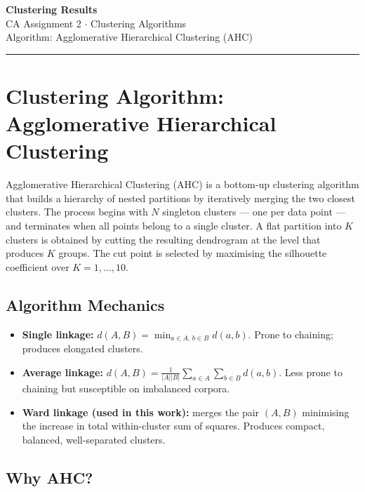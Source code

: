 \documentclass[11pt, a4paper]{article}
\begin{document}
\begin{center}
  {\LARGE\bfseries\color{darkblue} Clustering Results}\\[4pt]
  {\normalsize CA Assignment 2 $\cdot$ Clustering Algorithms}\\[2pt]
  {\normalsize Algorithm: Agglomerative Hierarchical Clustering (AHC)}
\end{center}

\vspace{4pt}
\textcolor{framebd}{\rule{\linewidth}{0.8pt}}
\vspace{6pt}

\section{Clustering Algorithm: Agglomerative Hierarchical Clustering}

Agglomerative Hierarchical Clustering (AHC) is a bottom-up clustering
algorithm that builds a hierarchy of nested partitions by iteratively merging
the two closest clusters.  The process begins with $N$ singleton clusters ---
one per data point --- and terminates when all points belong to a single
cluster.  A flat partition into $K$ clusters is obtained by cutting the
resulting dendrogram at the level that produces $K$ groups.  The cut point
is selected by maximising the silhouette coefficient over $K = 1, \ldots, 10$.

\subsection{Algorithm Mechanics}

\begin{itemize}
  \item \textbf{Single linkage:}
        $d(A,B) = \min_{a \in A,\, b \in B} d(a,b)$.
        Prone to chaining; produces elongated clusters.

  \item \textbf{Average linkage:}
        $d(A,B) = \frac{1}{|A||B|}\sum_{a \in A}\sum_{b \in B} d(a,b)$.
        Less prone to chaining but susceptible on imbalanced corpora.

  \item \textbf{Ward linkage (used in this work):}  merges the pair $(A, B)$
        minimising the increase in total within-cluster sum of squares.
        Produces compact, balanced, well-separated clusters.
\end{itemize}

\subsection{Why AHC?}
\end{document}
